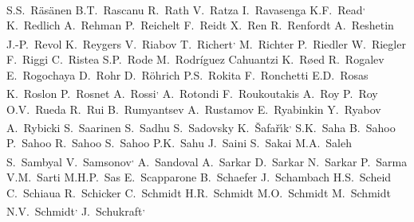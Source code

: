 \begin{flushleft}
S.S.~R\"{a}s\"{a}nen\And 
B.T.~Rascanu\And 
R.~Rath\And 
V.~Ratza\And 
I.~Ravasenga\And 
K.F.~Read\textsuperscript{,}\And 
K.~Redlich\And 
A.~Rehman\And 
P.~Reichelt\And 
F.~Reidt\And 
X.~Ren\And 
R.~Renfordt\And 
A.~Reshetin\And 
J.-P.~Revol\And 
K.~Reygers\And 
V.~Riabov\And 
T.~Richert\textsuperscript{,}\And 
M.~Richter\And 
P.~Riedler\And 
W.~Riegler\And 
F.~Riggi\And 
C.~Ristea\And 
S.P.~Rode\And 
M.~Rodr\'{i}guez Cahuantzi\And 
K.~R{\o}ed\And 
R.~Rogalev\And 
E.~Rogochaya\And 
D.~Rohr\And 
D.~R\"ohrich\And 
P.S.~Rokita\And 
F.~Ronchetti\And 
E.D.~Rosas\And 
K.~Roslon\And 
P.~Rosnet\And 
A.~Rossi\textsuperscript{,}\And 
A.~Rotondi\And 
F.~Roukoutakis\And 
A.~Roy\And 
P.~Roy\And 
O.V.~Rueda\And 
R.~Rui\And 
B.~Rumyantsev\And 
A.~Rustamov\And 
E.~Ryabinkin\And 
Y.~Ryabov\And 
A.~Rybicki\And 
S.~Saarinen\And 
S.~Sadhu\And 
S.~Sadovsky\And 
K.~\v{S}afa\v{r}\'{\i}k\textsuperscript{,}\And 
S.K.~Saha\And 
B.~Sahoo\And 
P.~Sahoo\And 
R.~Sahoo\And 
S.~Sahoo\And 
P.K.~Sahu\And 
J.~Saini\And 
S.~Sakai\And 
M.A.~Saleh\And 
S.~Sambyal\And 
V.~Samsonov\textsuperscript{,}\And 
A.~Sandoval\And 
A.~Sarkar\And 
D.~Sarkar\And 
N.~Sarkar\And 
P.~Sarma\And 
V.M.~Sarti\And 
M.H.P.~Sas\And 
E.~Scapparone\And 
B.~Schaefer\And 
J.~Schambach\And 
H.S.~Scheid\And 
C.~Schiaua\And 
R.~Schicker\And 
C.~Schmidt\And 
H.R.~Schmidt\And 
M.O.~Schmidt\And 
M.~Schmidt\And 
N.V.~Schmidt\textsuperscript{,}\And 
J.~Schukraft\textsuperscript{,}\And 

\end{flushleft}
